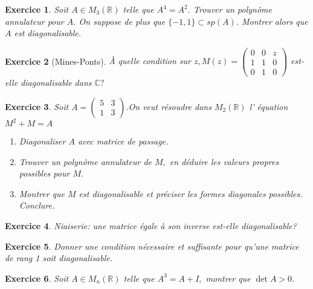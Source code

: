 \documentclass[12pt,a4paper]{article}
\newcommand{\R}{\mathbb{R}}
\theoremstyle{break}
\theoremstyle{break}
\newtheorem{Exo}{Exercice}
\begin{document}
\begin{Exo}
	Soit $A\in M_3(\R)$ telle que $A^4=A^2$. Trouver un polynôme annulateur pour $A$. On suppose de plus que $\{-1,1\}\subset sp(A)$. Montrer alors que $A$ est diagonalisable.
\end{Exo}

\begin{Exo}[Mines-Ponts]
	À quelle condition sur $z, M(z)=\left(\begin{array}{lll}0 & 0 & z \\ 1 & 1 & 0 \\ 0 & 1 & 0\end{array}\right)$ est-elle diagonalisable dans $\mathbb{C} ?$
\end{Exo}

\begin{Exo}
	Soit $A=\left( 
\begin{array}{ll}
	5 & 3 \\ 
	1 & 3%
\end{array}%
\right)$.On veut r\'{e}soudre dans $M_{2}\left( \mathbb{R}\right) $ l'%
\'{e}quation $M^{2}+M=A$

\begin{enumerate}
	\item Diagonaliser $A$ avec matrice de passage.
	
	
	
	\item Trouver un polyn\^{o}me annulateur de $M,$ en d\'{e}duire les valeurs
	propres possibles pour $M.$
	
	\item Montrer que $M$ est diagonalisable et pr\'{e}ciser les formes
	diagonales possibles. Conclure.
\end{enumerate}
\end{Exo}

\begin{Exo}
	
 Niaiserie: une matrice \'{e}gale \`{a} son inverse est-elle
diagonalisable?
\end{Exo}

\begin{Exo}
	Donner une condition nécessaire et suffisante pour qu'une matrice de rang 1 soit diagonalisable.
\end{Exo}

 \begin{Exo}
	Soit $A\in M_{n}\left( \mathbb{R}\right) $ telle que $A^{3}=A+I,$
montrer que $\det A>0.$
\end{Exo}
\end{document}
